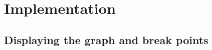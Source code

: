 
\section{Implementation} \label{sec:implementation}


\subsection{Displaying the graph and break points} \label{sec:graph-implementation}